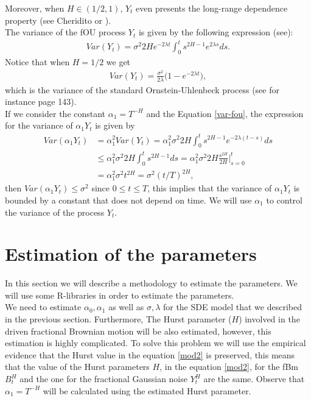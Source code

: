 \documentclass[smallextended]{svjour3}
\begin{document}
Moreover, when $H \in(1/2,1)$, $Y_t$ even presents the long-range dependence 
property (see Cheridito
\cite{ch-ka-ma} or  \cite{ra}).\\

The variance of the fOU process $Y_t$ is given by the following expression 
(see\cite{ze-ch-ya}):
\begin{align}
Var(Y_t)= \sigma^2 2H e^{-2\lambda t} \int_0^t s^{2H-1} e^{2\lambda s} 
ds.\label{var-fou}
\end{align}
Notice that when $H=1/2$ we get
\begin{align}
Var(Y_t)= \frac{\sigma^2}{2\lambda}  \big(1-e^{-2\lambda t}\big),
\end{align}
which is the variance of the standard Ornstein-Uhlenbeck process (see for 
instance \cite{mik} page 143). \\

If we consider the constant $\alpha_1 = T^{-H}$ and the Equation 
\eqref{var-fou},
the expression for the variance of $\alpha_1 Y_t$ is given by
\begin{align}
Var(\alpha_1 Y_t)&= \alpha_1^2 Var(Y_t)= \alpha_1^2\sigma^2 2H  \int_0^t 
s^{2H-1} e^{-2\lambda (t-s)} ds\nonumber
\\
&\le \alpha_1^2 \sigma^2 2H  \int_0^t s^{2H-1} ds= \alpha_1^2 \sigma^2 2H  
\frac{s^{2H}}{2H}\Big|_{s=0}^t \nonumber
\\
&= \alpha_1^2 \sigma^2 t^{2H} = \sigma^2 (t/T)^{2H},\label{var-fou1}
\end{align}
then $Var(\alpha_1 Y_t)\le \sigma^2 $ since $0\le t\le T$, this implies that 
the variance of $\alpha_1 Y_t$
is bounded by a constant that does not depend on time. We will use $\alpha_1$  
to control the variance of the process $Y_t$.



\section{Estimation of the parameters}
\label{esti}

In this section we will describe a methodology to estimate the parameters.
We will use some R-libraries in order to estimate the parameters. \\

We need to estimate $\alpha_0, \alpha_1$ as well as $\sigma,\lambda$ for the 
SDE model that we described in the previous section. Furthermore,
The Hurst parameter ($H$) involved in the driven fractional Brownian motion 
will be also estimated, however, this estimation is highly complicated.
To solve this problem we will use the empirical evidence that the Hurst value 
in the equation \eqref{mod2}
is preserved, this means that the  value of the  Hurst parameters $H$, in the 
equation \eqref{mod2}, for the fBm $B_t^H$ and the one for the
fractional Gaussian noise $Y_t^H$ are the same. Observe that $\alpha_1=T^{-H}$ 
will be calculated using the estimated Hurst parameter.
\end{document}
